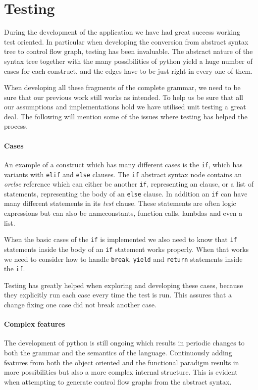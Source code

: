 \section{Testing}
During the development of the application we have had great success working test oriented.
In particular when developing the conversion from abstract syntax tree to control flow graph, testing has been invaluable.
The abstract nature of the syntax tree together with the many possibilities of python yield a huge number of cases for each construct, and the edges have to be just right in every one of them.

When developing all these fragments of the complete grammar, we need to be sure that our previous work still works as intended.
To help us be sure that all our assumptions and implementations hold we have utilised unit testing a great deal.
The following will mention some of the issues where testing has helped the process.

\paragraph{Cases}
An example of a construct which has many different cases is the \texttt{if}, which has variants with \texttt{elif} and \texttt{else} clauses.
The \texttt{if} abstract syntax node contains an \emph{orelse} reference which can either be another \texttt{if}, representing an  clause, or a list of statements, representing the body of an \texttt{else} clause.
In addition an \texttt{if} can have many different statements in its \emph{test} clause.
These statements are often logic expressions but can also be nameconstants, function calls, lambdas and even a list.

When the basic cases of the \texttt{if} is implemented we also need to know that \texttt{if} statements inside the body of an \texttt{if} statement works properly.
When that works we need to consider how to handle \texttt{break}, \texttt{yield} and \texttt{return} statements inside the \texttt{if}.

Testing has greatly helped when exploring and developing these cases, because they explicitly run each case every time the test is run.
This assures that a change fixing one case did not break another case.

\paragraph{Complex features}
The development of python is still ongoing which results in periodic changes to both the grammar and the semantics of the language.
Continuously adding features from both the object oriented and the functional paradigm results in more possibilities but also a more complex internal structure.
This is evident when attempting to generate control flow graphs from the abstract syntax.

